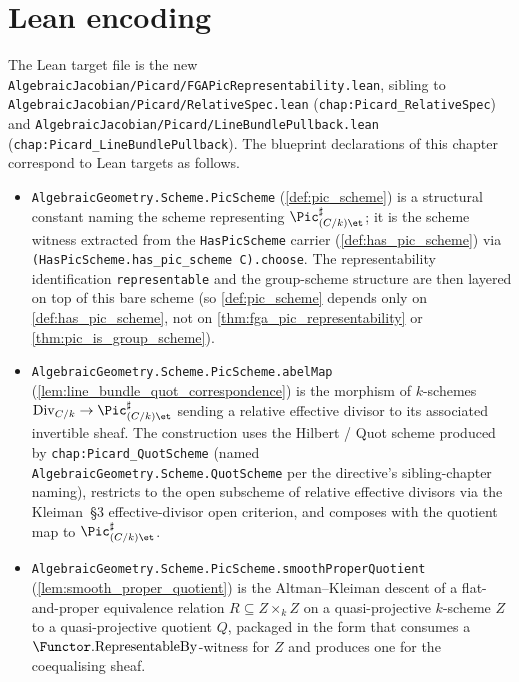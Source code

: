\section{Lean encoding}
\label{sec:fga_pic_lean_encoding}

The Lean target file is the new
\texttt{AlgebraicJacobian/Picard/FGAPicRepresentability.lean}, sibling to
\texttt{AlgebraicJacobian/Picard/RelativeSpec.lean}
(\texttt{chap:Picard\_RelativeSpec}) and
\texttt{AlgebraicJacobian/Picard/LineBundlePullback.lean}
(\texttt{chap:Picard\_LineBundlePullback}). The blueprint declarations of
this chapter correspond to Lean targets as follows.

\begin{itemize}
  \item \texttt{AlgebraicGeometry.Scheme.PicScheme}
    (\cref{def:pic_scheme}) is a structural constant naming the scheme
    representing \(\Pic^\sharp_{(C/k)\et}\); it is the scheme witness
    extracted from the \texttt{HasPicScheme} carrier
    (\cref{def:has_pic_scheme}) via \texttt{(HasPicScheme.has\_pic\_scheme
    C).choose}. The representability identification \texttt{representable}
    and the group-scheme structure are then layered on top of this bare
    scheme (so \cref{def:pic_scheme} depends only on \cref{def:has_pic_scheme},
    not on \cref{thm:fga_pic_representability} or
    \cref{thm:pic_is_group_scheme}).
  \item \texttt{AlgebraicGeometry.Scheme.PicScheme.abelMap}
    (\cref{lem:line_bundle_quot_correspondence}) is the morphism of
    \(k\)-schemes \(\mathrm{Div}_{C/k} \to \Pic^\sharp_{(C/k)\et}\) sending a
    relative effective divisor to its associated invertible sheaf.
    The construction uses the Hilbert / Quot scheme produced by
    \texttt{chap:Picard\_QuotScheme} (named
    \texttt{AlgebraicGeometry.Scheme.QuotScheme} per the directive's
    sibling-chapter naming), restricts to the open subscheme of relative
    effective divisors via the Kleiman~\S 3 effective-divisor open
    criterion, and composes with the quotient map to
    \(\Pic^\sharp_{(C/k)\et}\).
  \item \texttt{AlgebraicGeometry.Scheme.PicScheme.smoothProperQuotient}
    (\cref{lem:smooth_proper_quotient}) is the Altman--Kleiman
    descent of a flat-and-proper equivalence relation \(R \subseteq Z
    \times_k Z\) on a quasi-projective \(k\)-scheme \(Z\) to a
    quasi-projective quotient \(Q\), packaged in the form that consumes
    a \(\Functor.\mathrm{RepresentableBy}\)-witness for \(Z\) and produces
    one for the coequalising sheaf.

\end{itemize}
